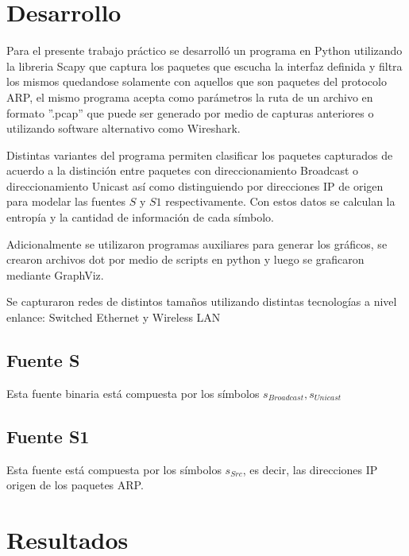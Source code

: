 \documentclass[letterpaper, 10 pt, conference]{ieeeconf}  %
\begin{document}



\section{Desarrollo}
Para el presente trabajo práctico se desarrolló un programa en Python utilizando la libreria Scapy que captura los paquetes que escucha la interfaz definida y filtra los mismos quedandose solamente con aquellos que son paquetes del protocolo ARP, el mismo programa acepta como parámetros la ruta de un archivo en formato ''.pcap'' que puede ser generado por medio de capturas anteriores o utilizando software alternativo como Wireshark.

Distintas variantes del programa permiten clasificar los paquetes capturados de acuerdo a la distinción entre paquetes con direccionamiento Broadcast o direccionamiento Unicast así como distinguiendo por direcciones IP de origen para modelar las fuentes $S$ y $S1$ respectivamente. Con estos datos se calculan la entropía y la cantidad de información de cada símbolo.

Adicionalmente se utilizaron programas auxiliares para generar los gráficos, se crearon archivos dot por medio de scripts en python y luego se graficaron mediante GraphViz.

Se capturaron redes de distintos tamaños utilizando distintas tecnologías a nivel enlance: Switched Ethernet y Wireless LAN


\subsection{Fuente S}
Esta fuente binaria está compuesta por los símbolos ${s_{Broadcast}, s_{Unicast}}$

\subsection{Fuente S1}

Esta fuente está compuesta por los símbolos $s_{Src}$, es decir, las direcciones IP origen de los paquetes ARP.

\section{Resultados}
\end{document}
